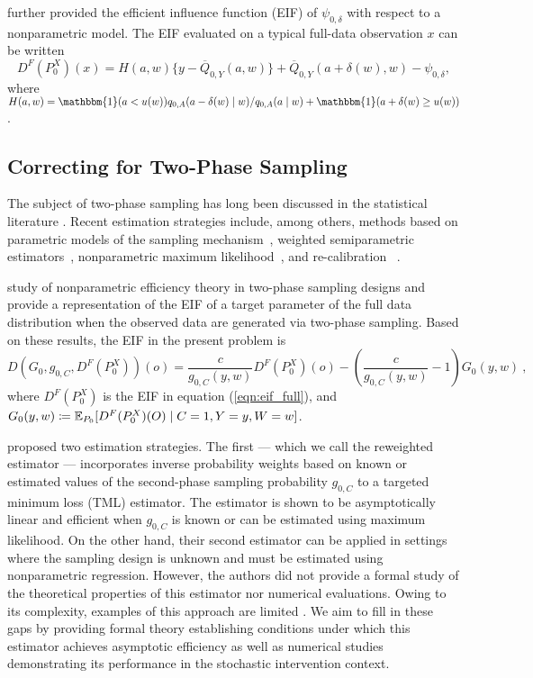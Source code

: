 \citet{diaz2012population} further provided the efficient influence function
(EIF) of $\psi_{0,\delta}$ with respect to a nonparametric model. The EIF
evaluated on a typical full-data observation $x$ can be written
\begin{equation}\label{eqn:eif_full} D^F(P_0^X)(x) = H(a, w)\{y
- \overline{Q}_{0,Y}(a, w)\} + \overline{Q}_{0,Y}(a + \delta(w), w)
- \psi_{0,\delta},
\end{equation} where $H(a, w) = \mathbbm{1}(a < u(w)) q_{0, A}(a - \delta(w)
\mid w)/q_{0, A}(a \mid w) + \mathbbm{1}(a + \delta(w) \geq u(w))$.

\subsection{Correcting for Two-Phase Sampling}\label{samp_lit}

The subject of two-phase sampling has long been discussed in the statistical
literature \citep{neyman1938contribution,manski1977estimation,white1982two}.
Recent estimation strategies include, among others, methods based on parametric
models of the sampling mechanism~\citep{breslow1988logistic}, weighted
semiparametric estimators~\citep{robins1994estimation}, nonparametric maximum
likelihood~\citep{breslow2003large}, and re-calibration
~\citep{fong2015calibration}.

\citet{rose2011targeted2sd} study of nonparametric efficiency theory in
two-phase sampling designs and provide a representation of the EIF of a target
parameter of the full data distribution when the observed data are generated via
two-phase sampling. Based on these results, the EIF in the present problem is
\begin{equation}\label{eqn:eif_obs}
  D(G_0, g_{0,C}, D^F(P_0^X))(o) = \frac{c}{g_{0,C}(y, w)} D^F(P_0^X)(o) -
  \left(\frac{c}{g_{0,C}(y,w)} - 1 \right) G_0(y,w) \ ,
\end{equation}
where $D^F(P_0^X)$ is the EIF in equation (\ref{eqn:eif_full}), and $G_0(y,w)
\coloneqq \mathbb{E}_{P_0} [D^F(P_0^X)(O) \mid C = 1, Y = y, W = w]$.

\citet{rose2011targeted2sd} proposed two estimation strategies. The first ---
which we call the reweighted estimator --- incorporates inverse probability
weights based on known or estimated values of the second-phase sampling
probability $g_{0,C}$ to a targeted minimum loss (TML) estimator. The estimator
is shown to be asymptotically linear and efficient when $g_{0,C}$ is known or
can be estimated using maximum likelihood. On the other hand, their second
estimator can be applied in settings where the sampling design is unknown and
must be estimated using nonparametric regression. However, the authors did not
provide a formal study of the theoretical properties of this estimator nor
numerical evaluations. Owing to its complexity, examples of this approach are
limited \citep[e.g.,][]{brown2014applications}. We aim to fill in these gaps by
providing formal theory establishing conditions under which this estimator
achieves asymptotic efficiency as well as numerical studies demonstrating its
performance in the stochastic intervention context.

